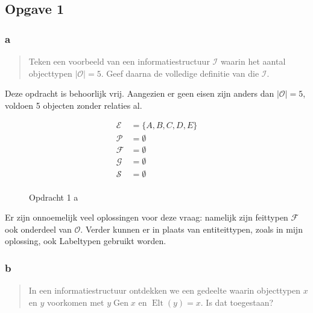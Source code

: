 \documentclass[10pt]{article}
\newcommand{\Gen}{\ensuremath{\operatorname{Gen}}}
\begin{document}
\subsection{Opgave 1}

\subsubsection{a}
\begin{quote}
  Teken een voorbeeld van een informatiestructuur $\mathcal{I}$ waarin het aantal objecttypen 
  $|\mathcal{O}| = 5$. Geef daarna de volledige definitie van die $\mathcal{I}$.\cite{tentamen2011}
\end{quote}

Deze opdracht is behoorlijk vrij. Aangezien er geen eisen zijn anders dan
$|\mathcal{O}| =5$, voldoen 5 objecten zonder relaties al. 

\begin{align*}
  \mathcal{E} & = \{A,B,C,D,E\} \\
  \mathcal{P} & = \emptyset\\
  \mathcal{F} & = \emptyset \\
  \mathcal{G} & = \emptyset        \\  
  \mathcal{S} & = \emptyset        \\
\end{align*}


\begin{figure}[h]
  \centering
  \caption{Opdracht 1 a}
  \label{fig:5-1-a}
\end{figure}

Er zijn onnoemelijk veel oplossingen voor deze vraag: namelijk zijn feittypen
$\mathcal{F}$ ook onderdeel van $\mathcal{O}$. Verder kunnen er in plaats van
entiteittypen, zoals in mijn oplossing, ook Labeltypen gebruikt worden.

\subsubsection{b}

\begin{quote}
  In een informatiestructuur ontdekken we een gedeelte waarin objecttypen $x$ en
  $y$ voorkomen met $y \Gen x$ en $\operatorname{Elt}(y) = x$. Is dat toegestaan?
  \cite{tentamen2011}
\end{quote}
\end{document}
